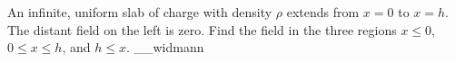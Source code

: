 An infinite, uniform slab of charge with density $\rho$ extends from
$x=0$ to $x=h$. The distant field on the left is zero. Find the field
in the three regions $x\le 0$, $0\le x \le h$, and $h\le x$.
__widmann
\answercheck
